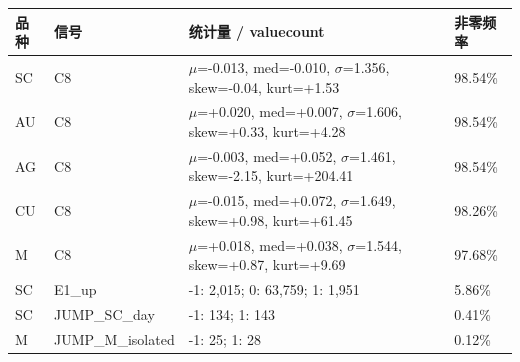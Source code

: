 \setlength{\tabcolsep}{4pt}
\begin{tabular}{llp{8.6cm}l}
\toprule
品种 & 信号 & 统计量 / valuecount & 非零频率 \\
\midrule
SC & C8 & $\mu$=-0.013, med=-0.010, $\sigma$=1.356, skew=-0.04, kurt=+1.53 & 98.54\% \\
AU & C8 & $\mu$=+0.020, med=+0.007, $\sigma$=1.606, skew=+0.33, kurt=+4.28 & 98.54\% \\
AG & C8 & $\mu$=-0.003, med=+0.052, $\sigma$=1.461, skew=-2.15, kurt=+204.41 & 98.54\% \\
CU & C8 & $\mu$=-0.015, med=+0.072, $\sigma$=1.649, skew=+0.98, kurt=+61.45 & 98.26\% \\
M & C8 & $\mu$=+0.018, med=+0.038, $\sigma$=1.544, skew=+0.87, kurt=+9.69 & 97.68\% \\
SC & E1\_up & -1: 2,015; 0: 63,759; 1: 1,951 & 5.86\% \\
SC & JUMP\_SC\_day & -1: 134; 1: 143 & 0.41\% \\
M & JUMP\_M\_isolated & -1: 25; 1: 28 & 0.12\% \\
\bottomrule
\end{tabular}
